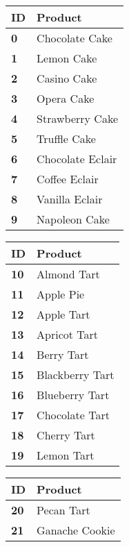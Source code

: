\documentclass[paper=a4, fontsize=11pt]{scrartcl} %
\numberwithin{equation}{section} %
\numberwithin{figure}{section} %
\numberwithin{table}{section} %
\begin{document}
\begin{table}[h]
\begingroup
\fontsize{6pt}{10pt}\selectfont
\begin{minipage}[t]{0.18\linewidth}
\centering
	\begin{tabular}[t]{ll}
    \toprule
\textbf{ID} & \textbf{Product} \\
    \midrule
\textbf{0} & Chocolate Cake \\
\textbf{1} & Lemon Cake \\
\textbf{2} & Casino Cake \\
\textbf{3} & Opera Cake \\
\textbf{4} & Strawberry Cake \\
\textbf{5} & Truffle Cake \\
\textbf{6} & Chocolate Eclair \\
\textbf{7} & Coffee Eclair \\
\textbf{8} & Vanilla Eclair \\
\textbf{9} & Napoleon Cake \\
    \bottomrule
    \end{tabular}%
\end{minipage}
\begin{minipage}[t]{0.18\linewidth}
\centering
    \begin{tabular}[t]{ll}
    \toprule
\textbf{ID} & \textbf{Product} \\
    \midrule
\textbf{10} & Almond Tart \\
\textbf{11} & Apple Pie \\
\textbf{12} & Apple Tart \\
\textbf{13} & Apricot Tart \\
\textbf{14} & Berry Tart \\
\textbf{15} & Blackberry Tart \\
\textbf{16} & Blueberry Tart \\
\textbf{17} & Chocolate Tart \\
\textbf{18} & Cherry Tart \\
\textbf{19} & Lemon Tart \\
\bottomrule
    \end{tabular}%
\end{minipage}
\begin{minipage}[t]{0.19\linewidth}
\centering
    \begin{tabular}[t]{ll}
    \toprule
\textbf{ID} & \textbf{Product} \\
    \midrule
\textbf{20} & Pecan Tart \\
\textbf{21} & Ganache Cookie \\

\end{tabular}
\end{minipage}
\end{table}
\end{document}
